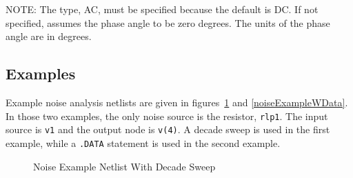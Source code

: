 
NOTE:	The type, AC, must be specified because the default is DC. If not specified, \Xyce{} assumes the
phase angle to be zero degrees.  The units of the phase angle are in degrees.

\subsection{Examples}

Example noise analysis netlists are given in figures~\ref{noiseExample} and
\ref{noiseExampleWData}.  In those two examples, the only noise source is the
resistor, \texttt{rlp1}.  The input source is \texttt{v1} and the output node is
\texttt{v(4)}.  A decade sweep is used in the first example, while a \texttt{.DATA}
statement is used in the second example.
\begin{figure}[htbp]
  \begin{centering}
\caption[Noise Example Netlist With Decade Sweep]
{Noise Example Netlist With Decade Sweep\label{noiseExample} }
\end{centering}
\end{figure}

